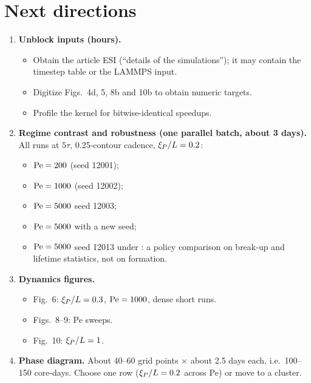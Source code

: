 \section{Next directions}\label{sec:next}
\begin{enumerate}
\item \textbf{Unblock inputs (hours).}
\begin{itemize}
\item Obtain the article ESI (``details of the simulations''); it may contain the timestep table or the LAMMPS input.
\item Digitize Figs.~4d, 5, 8b and 10b to obtain numeric targets.
\item Profile the kernel for bitwise-identical speedups.
\end{itemize}
\item \textbf{Regime contrast and robustness (one parallel batch, about 3 days).} All runs at $5\tau$, 0.25-contour cadence, $\xi_{P}/L=0.2$:
\begin{itemize}
\item $\mathrm{Pe}=200$ (seed 12001);
\item $\mathrm{Pe}=1000$ (seed 12002);
\item $\mathrm{Pe}=5000$ seed 12003;
\item $\mathrm{Pe}=5000$ with a new seed;
\item $\mathrm{Pe}=5000$ seed 12013 under : a policy comparison on break-up and lifetime statistics, not on formation.
\end{itemize}
\item \textbf{Dynamics figures.}
\begin{itemize}
\item Fig.~6: $\xi_{P}/L=0.3$, $\mathrm{Pe}=1000$, dense short runs.
\item Figs.~8--9: Pe sweeps.
\item Fig.~10: $\xi_{P}/L=1$.
\end{itemize}
\item \textbf{Phase diagram.} About 40--60 grid points $\times$ about 2.5 days each, i.e.\ 100--150 core-days. Choose one row ($\xi_{P}/L=0.2$ across Pe) or move to a cluster.
\end{enumerate}

\appendix
